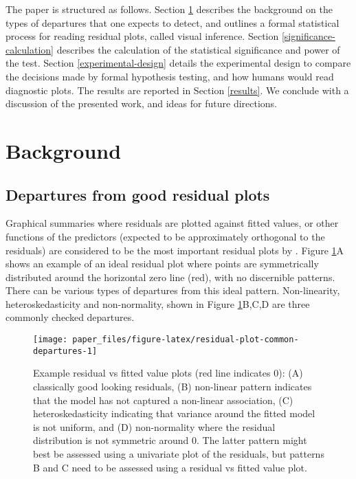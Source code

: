 \documentclass[]{interact}
\theoremstyle{plain}%
\theoremstyle{definition}
\theoremstyle{remark}
\begin{document}
The paper is structured as follows. Section \ref{background} describes
the background on the types of departures that one expects to detect,
and outlines a formal statistical process for reading residual plots,
called visual inference. Section \ref{significance-calculation}
describes the calculation of the statistical significance and power of
the test. Section \ref{experimental-design} details the experimental
design to compare the decisions made by formal hypothesis testing, and
how humans would read diagnostic plots. The results are reported in
Section \ref{results}. We conclude with a discussion of the presented
work, and ideas for future directions.

\hypertarget{background}{%
\section{Background}\label{background}}

\hypertarget{departures-from-good-residual-plots}{%
\subsection{Departures from good residual
plots}\label{departures-from-good-residual-plots}}

Graphical summaries where residuals are plotted against fitted values,
or other functions of the predictors (expected to be approximately
orthogonal to the residuals) are considered to be the most important
residual plots by \citet{cook1999applied}. Figure
\ref{fig:residual-plot-common-departures}A shows an example of an ideal
residual plot where points are symmetrically distributed around the
horizontal zero line (red), with no discernible patterns. There can be
various types of departures from this ideal pattern. Non-linearity,
heteroskedasticity and non-normality, shown in Figure
\ref{fig:residual-plot-common-departures}B,C,D are three commonly
checked departures.

\begin{figure}[t!]

{\centering \texttt{[image: paper\_files/figure-latex/residual-plot-common-departures-1]} 

}

\caption{Example residual vs fitted value plots (red line indicates 0): (A) classically good looking residuals, (B) non-linear pattern indicates that the model has not captured a non-linear association, (C) heteroskedasticity indicating that variance around the fitted model is not uniform, and (D) non-normality where the residual distribution is not symmetric around 0. The latter pattern might best be assessed using a univariate plot of the residuals, but patterns B and C need to be assessed using a residual vs fitted value plot.}\label{fig:residual-plot-common-departures}
\end{figure}
\end{document}
